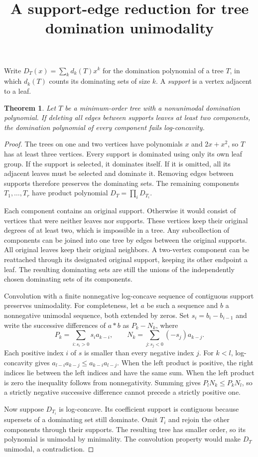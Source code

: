 \documentclass[10pt]{article}
\title{A support-edge reduction for tree domination unimodality}
\author{}
\date{}
\newtheorem{theorem}{Theorem}
\begin{document}
\maketitle
\vspace{-2.4em}
Write $D_T(x)=\sum_k d_k(T)x^k$ for the domination polynomial of a tree $T$, in which $d_k(T)$ counts its dominating sets of size $k$. A \emph{support} is a vertex adjacent to a leaf.

\begin{theorem}
Let $T$ be a minimum-order tree with a nonunimodal domination polynomial. If deleting all edges between supports leaves at least two components, the domination polynomial of every component fails log-concavity.
\end{theorem}

\begin{proof}
The trees on one and two vertices have polynomials $x$ and $2x+x^2$, so $T$ has at least three vertices. Every support is dominated using only its own leaf group. If the support is selected, it dominates itself. If it is omitted, all its adjacent leaves must be selected and dominate it. Removing edges between supports therefore preserves the dominating sets. The remaining components $T_1,\dots,T_r$ have product polynomial $D_T=\prod_i D_{T_i}$.

Each component contains an original support. Otherwise it would consist of vertices that were neither leaves nor supports. These vertices keep their original degrees of at least two, which is impossible in a tree. Any subcollection of components can be joined into one tree by edges between the original supports. All original leaves keep their original neighbors. A two-vertex component can be reattached through its designated original support, keeping its other endpoint a leaf. The resulting dominating sets are still the unions of the independently chosen dominating sets of its components.

Convolution with a finite nonnegative log-concave sequence of contiguous support preserves unimodality. For completeness, let $a$ be such a sequence and $b$ a nonnegative unimodal sequence, both extended by zeros. Set $s_i=b_i-b_{i-1}$ and write the successive differences of $a*b$ as $P_k-N_k$, where
\[
P_k=\sum_{i:s_i>0}s_i a_{k-i},\qquad N_k=\sum_{j:s_j<0}(-s_j)a_{k-j}.
\]
Each positive index $i$ of $s$ is smaller than every negative index $j$. For $k<l$, log-concavity gives $a_{l-i}a_{k-j}\le a_{k-i}a_{l-j}$. When the left product is positive, the right indices lie between the left indices and have the same sum. When the left product is zero the inequality follows from nonnegativity. Summing gives $P_lN_k\le P_kN_l$, so a strictly negative successive difference cannot precede a strictly positive one.

Now suppose $D_{T_i}$ is log-concave. Its coefficient support is contiguous because supersets of a dominating set still dominate. Omit $T_i$ and rejoin the other components through their supports. The resulting tree has smaller order, so its polynomial is unimodal by minimality. The convolution property would make $D_T$ unimodal, a contradiction.
\end{proof}
\end{document}
